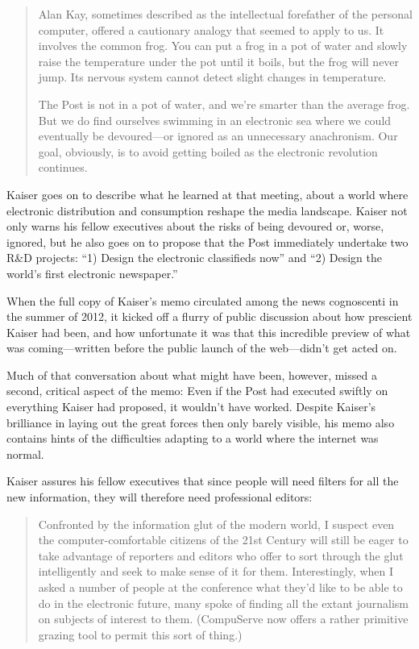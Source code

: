 \begin{quote}
Alan Kay, sometimes described as the intellectual forefather of the personal
computer, offered a cautionary analogy that seemed to apply to
us. It involves the common frog. You can put a frog in a pot of water
and slowly raise the temperature under the pot until it boils, but the
frog will never jump. Its nervous system cannot detect slight changes
in temperature.

The Post is not in a pot of water, and we’re smarter than the average
frog. But we do find ourselves swimming in an electronic sea where we
could eventually be devoured—or ignored as an unnecessary anachronism.
Our goal, obviously, is to avoid getting boiled as the electronic
revolution continues.
\end{quote}

Kaiser goes on to describe what he learned at that meeting, about a world
where electronic distribution and consumption reshape the media landscape.
Kaiser not only warns his fellow executives about the risks of being devoured
or, worse, ignored, but he also goes on to propose that the Post immediately
undertake two R&D projects: ``1) Design the electronic classifieds now'' and
``2) Design the world’s first electronic newspaper.''

When the full copy of Kaiser’s memo circulated among the news cognoscenti in
the summer of 2012, it kicked off a flurry of public discussion about how prescient
Kaiser had been, and how unfortunate it was that this incredible preview
of what was coming—written before the public launch of the web—didn’t get
acted on.

Much of that conversation about what might have been, however, missed a second,
critical aspect of the memo: Even if the Post had executed swiftly on everything
Kaiser had proposed, it wouldn’t have worked. Despite Kaiser’s brilliance in
laying out the great forces then only barely visible, his memo also contains hints
of the difficulties adapting to a world where the internet was normal.

Kaiser assures his fellow executives that since people will need filters for all the
new information, they will therefore need professional editors:

\begin{quote}
Confronted by the information glut of the modern world, I suspect even
the computer-comfortable citizens of the 21st Century will still be eager
to take advantage of reporters and editors who offer to sort through the
glut intelligently and seek to make sense of it for them. Interestingly,
when I asked a number of people at the conference what they’d like to
be able to do in the electronic future, many spoke of finding all the extant
journalism on subjects of interest to them. (CompuServe now offers
a rather primitive grazing tool to permit this sort of thing.)
\end{quote}

